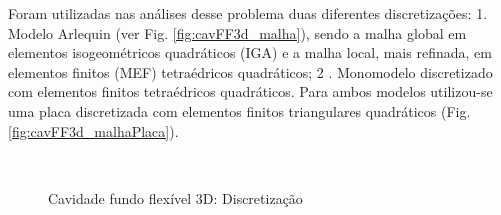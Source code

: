 \documentclass[tese_patricia]{subfiles}
\begin{document}
Foram utilizadas nas análises desse problema duas diferentes discretizações: 1. Modelo Arlequin (ver Fig. \ref{fig:cavFF3d_malha}), sendo a malha global em elementos isogeométricos quadráticos (IGA) e a malha local, mais refinada, em elementos finitos (MEF) tetraédricos quadráticos; 2 . Monomodelo discretizado com elementos finitos tetraédricos quadráticos. Para ambos modelos utilizou-se uma placa discretizada com elementos finitos triangulares quadráticos (Fig. \ref{fig:cavFF3d_malhaPlaca}).

\begin{figure}[htb!]
	\centering
	\\ 
	\caption{Cavidade fundo flexível 3D: Discretização}
	
\end{figure}
\end{document}
